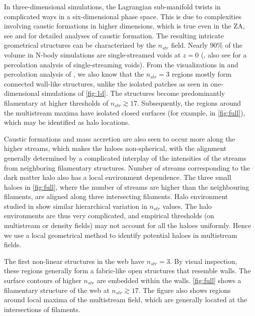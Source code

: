 \documentclass[fleqn,usenatbib,useAMS]{mnras}
\newcommand\ghl{\bgroup\markoverwith
  {\textcolor{green}{\rule[-.5ex]{2pt}{2.5ex}}}\ULon}
\begin{document}
In three-dimensional simulations, the Lagrangian sub-manifold twists in complicated ways in a six-dimensional phase space. This is due to complexities involving caustic formations in higher dimensions, which is true even in the ZA, see \citealt{Arnold1982} and \citealt{Hidding2014} for detailed analyses of caustic formation. The resulting intricate geometrical structures can be characterized by the $n_{str}$ field. Nearly  $90\%$ of the volume in N-body simulations are single-streamed voids at $z=0$ (\citealt{Shandarin2012}, also see \citealt{Falck2015} for a percolation analysis of single-streaming voids). From the visualizations in \cite{Ramachandra2015} and percolation analysis of \cite{Ramachandra2017}, we also know that the $n_{str} = 3$ regions mostly form connected wall-like structures, unlike the isolated patches as seen in one-dimensional simulations of \autoref{fig:1d}. The structures become predominantly filamentary at higher thresholds of $ n_{str} \gtrsim 17$. Subsequently, the regions around the multistream maxima have isolated closed surfaces (for example, in \autoref{fig:full}), which may be identified as halo locations. 

Caustic formations and mass accretion are also seen to occur more along the higher streams, which makes the haloes non-spherical, with the alignment generally determined by a complicated interplay  of the intensities of the streams from neighboring filamentary structures. Number of streams corresponding to the dark matter halo also has a local environment dependence. The three small haloes in \autoref{fig:full}, where the number of streams are higher than the neighbouring filaments, are aligned along three intersecting filaments. Halo environment studied in \cite{Ramachandra2015} show similar hierarchical variation in $n_{str}$ values. %
The halo environments are thus very complicated, and empirical thresholds (on multistream or density fields) may not account for all the haloes uniformly. Hence we use a local geometrical method to identify potential haloes in multistream fields.


The first non-linear structures in the web have $n_{str} = 3$. By visual inspection, these regions generally form a fabric-like open structures that resemble walls. The surface contours of higher $n_{str}$ are embedded within the walls. \autoref{fig:full} shows a filamentary structure of the web at $n_{str} \gtrsim 17$. The figure also shows regions around local maxima of the multistream field, which are generally located at the intersections of filaments.    
\end{document}
